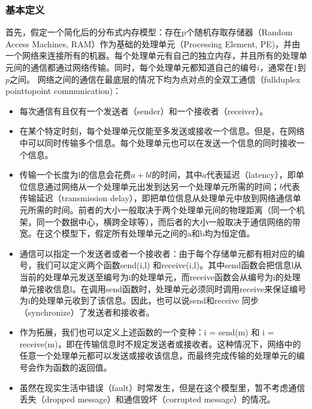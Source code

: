 \documentclass[letterpaper,10pt,english]{sphinxmanual}
\begin{document}
\subsubsection{基本定义}
\label{\detokenize{chapter_distributed_training/collective:id4}}
\sphinxAtStartPar
首先，假定一个简化后的分布式内存模型：存在p个随机存取存储器（Random
Access Machines, RAM）作为基础的处理单元（Processing Element,
PE)，并由一个网络来连接所有的机器。每个处理单元有自己的独立内存，并且所有的处理单元间的通信都通过网络传输。同时，每个处理单元都知道自己的编号\(i\)，通常在\(1\)到\(p\)之间。
网络之间的通信在最底层的情况下均为点对点的全双工通信（full\sphinxhyphen{}duplex
point\sphinxhyphen{}to\sphinxhyphen{}point communication)：
\begin{itemize}
\item {} 
\sphinxAtStartPar
每次通信有且仅有一个发送者（sender）和一个接收者（receiver）。

\item {} 
\sphinxAtStartPar
在某个特定时刻，每个处理单元仅能至多发送或接收一个信息。但是，在网络中可以同时传输多个信息。每个处理单元也可以在发送一个信息的同时接收一个信息。

\item {} 
\sphinxAtStartPar
传输一个长度为l的信息会花费\(a+bl\)的时间，其中\(a\)代表延迟（latency），即单位信息通过网络从一个处理单元出发到达另一个处理单元所需的时间；\(b\)代表传输延迟（transmission
delay），即把单位信息从处理单元中放到网络通信单元所需的时间。前者的大小一般取决于两个处理单元间的物理距离（同一个机架，同一个数据中心，横跨全球等），而后者的大小一般取决于通信网络的带宽。在这个模型下，假定所有处理单元之间的a和b均为恒定值。

\item {} 
\sphinxAtStartPar
通信可以指定一个发送者或者一个接收者：由于每个存储单元都有相对应的编号，我们可以定义两个函数send(i,l)
和receive(i,l)。其中send函数会把信息l从当前的处理单元发送至编号为i的处理单元，而receive函数会从编号为i的处理单元接收信息l。在调用send函数时，处理单元必须同时调用receive来保证编号为i的处理单元收到了该信息。因此，也可以说send和receive
同步（synchronize）了发送者和接收者。

\item {} 
\sphinxAtStartPar
作为拓展，我们也可以定义上述函数的一个变种：i = send(m) 和 i =
receive(m)，即在传输信息时不规定发送者或接收者。这种情况下，网络中的任意一个处理单元都可以发送或接收该信息，而最终完成传输的处理单元的编号会作为函数的返回值。

\item {} 
\sphinxAtStartPar
虽然在现实生活中错误（fault）时常发生，但是在这个模型里，暂不考虑通信丢失（dropped
message）和通信毁坏（corrupted message）的情况。

\end{itemize}
\end{document}
